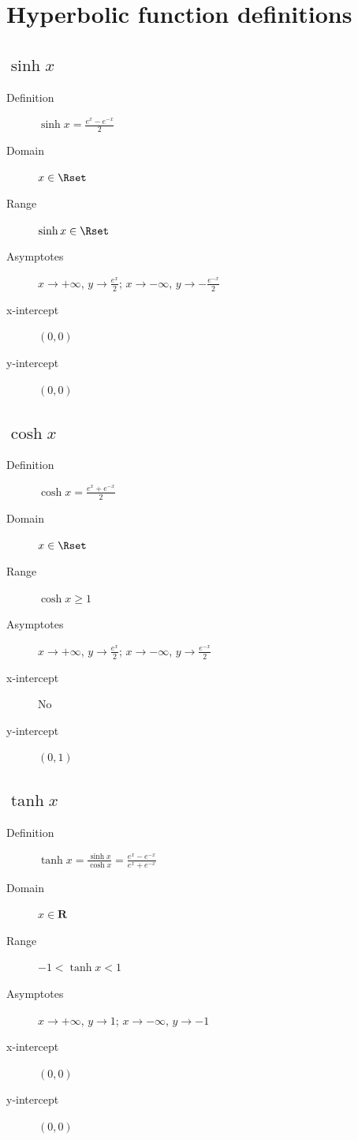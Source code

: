 \section{Hyperbolic function definitions}
\subsection{$\sinh x$}
\begin{description}
    \item[Definition] $\sinh x = \frac{e^x-e^{-x}}{2}$
    \item[Domain] $x \in \Rset$
    \item[Range] $\sinh x \in \Rset$
    \item[Asymptotes] $x\rightarrow +\infty$, $y\rightarrow\frac{e^x}{2}$; $x\rightarrow -\infty$, $y\rightarrow -\frac{e^{-x}}{2}$
    \item[x-intercept] $(0,0)$
    \item[y-intercept] $(0,0)$
\end{description}

\subsection{$\cosh x$}
\begin{description}
    \item[Definition] $\cosh x = \frac{e^x+e^{-x}}{2}$
    \item[Domain] $x \in \Rset$
    \item[Range] $\cosh x \geq 1$
    \item[Asymptotes] $x\rightarrow +\infty$, $y\rightarrow\frac{e^x}{2}$; $x\rightarrow -\infty$, $y\rightarrow\frac{e^{-x}}{2}$
    \item[x-intercept] No
    \item[y-intercept] $(0,1)$
\end{description}

\subsection{$\tanh x$}
\begin{description}
    \item[Definition] $\tanh x = \frac{\sinh x}{\cosh x}=\frac{e^x-e^{-x}}{e^x+e^{-x}}$
    \item[Domain] $x \in \textbf{R}$
    \item[Range] $-1 < \tanh x < 1$
    \item[Asymptotes] $x\rightarrow +\infty$, $y\rightarrow 1$; $x\rightarrow -\infty$, $y\rightarrow -1$
    \item[x-intercept] $(0,0)$
    \item[y-intercept] $(0,0)$
\end{description}

